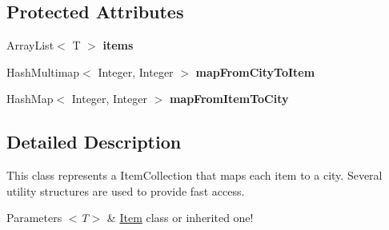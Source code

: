 \subsection*{Protected Attributes}
\begin{DoxyCompactItemize}
\item 
\hypertarget{classcom_1_1msu_1_1thief_1_1model_1_1ItemCollection_3_01T_01extends_01Item_01_4_a678804cba392f7ba8be19313f8b48c15}{Array\-List$<$ T $>$ {\bfseries items}}\label{classcom_1_1msu_1_1thief_1_1model_1_1ItemCollection_3_01T_01extends_01Item_01_4_a678804cba392f7ba8be19313f8b48c15}

\item 
\hypertarget{classcom_1_1msu_1_1thief_1_1model_1_1ItemCollection_3_01T_01extends_01Item_01_4_abdafcfaf4a7dbae104fd5b4e16f20b69}{Hash\-Multimap$<$ Integer, Integer $>$ {\bfseries map\-From\-City\-To\-Item}}\label{classcom_1_1msu_1_1thief_1_1model_1_1ItemCollection_3_01T_01extends_01Item_01_4_abdafcfaf4a7dbae104fd5b4e16f20b69}

\item 
\hypertarget{classcom_1_1msu_1_1thief_1_1model_1_1ItemCollection_3_01T_01extends_01Item_01_4_a7c4263b1bf9c6a5b7404db3247abe598}{Hash\-Map$<$ Integer, Integer $>$ {\bfseries map\-From\-Item\-To\-City}}\label{classcom_1_1msu_1_1thief_1_1model_1_1ItemCollection_3_01T_01extends_01Item_01_4_a7c4263b1bf9c6a5b7404db3247abe598}

\end{DoxyCompactItemize}


\subsection{Detailed Description}
This class represents a Item\-Collection that maps each item to a city. Several utility structures are used to provide fast access. 
\begin{DoxyParams}{Parameters}
{\em $<$\-T$>$} & \hyperlink{classcom_1_1msu_1_1thief_1_1model_1_1Item}{Item} class or inherited one! \\
\hline
\end{DoxyParams}


